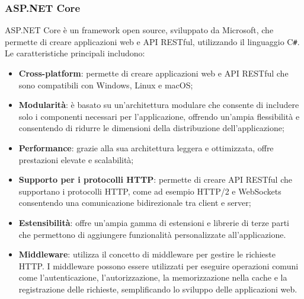 \subsubsection{ASP.NET Core}
ASP.NET Core è un framework open source, sviluppato da Microsoft, che permette di creare applicazioni web e API RESTful, utilizzando il linguaggio C\texttt{\#}. Le caratteristiche principali includono:
\begin{itemize}
\item \textbf{Cross-platform}: permette di creare applicazioni web e API RESTful che sono compatibili con Windows, Linux e macOS;
\item \textbf{Modularità}: è basato su un'architettura modulare che consente di includere solo i componenti necessari per l'applicazione, offrendo un'ampia flessibilità e consentendo di ridurre le dimensioni della distribuzione dell'applicazione;
\item \textbf{Performance}: grazie alla sua architettura leggera e ottimizzata, offre prestazioni elevate e scalabilità;
\item \textbf{Supporto per i protocolli HTTP}: permette di creare API RESTful che supportano i protocolli HTTP, come ad esempio HTTP/2 e WebSockets consentendo una comunicazione bidirezionale tra client e server;
\item \textbf{Estensibilità}: offre un'ampia gamma di estensioni e librerie di terze parti che permettono di aggiungere funzionalità personalizzate all'applicazione.
\item \textbf{Middleware}: utilizza il concetto di middleware per gestire le richieste HTTP. I middleware possono essere utilizzati per eseguire operazioni comuni come l'autenticazione, l'autorizzazione, la memorizzazione nella cache e la registrazione delle richieste, semplificando lo sviluppo delle applicazioni web.
\end{itemize}
